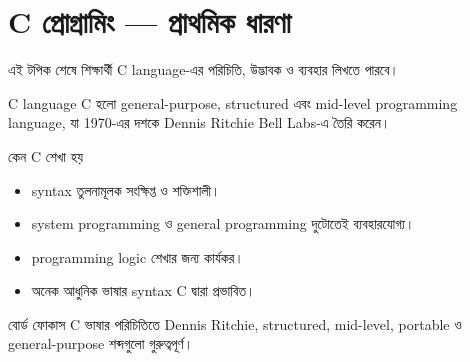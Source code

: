 \section{C প্রোগ্রামিং — প্রাথমিক ধারণা}

\begin{learningbox}
এই টপিক শেষে শিক্ষার্থী C language-এর পরিচিতি, উদ্ভাবক ও ব্যবহার লিখতে পারবে।
\end{learningbox}

\begin{definitionbox}{C language}
C হলো general-purpose, structured এবং mid-level programming language, যা 1970-এর দশকে Dennis Ritchie Bell Labs-এ তৈরি করেন।
\end{definitionbox}

\begin{keypointbox}{কেন C শেখা হয়}
\begin{itemize}
\item syntax তুলনামূলক সংক্ষিপ্ত ও শক্তিশালী।
\item system programming ও general programming দুটোতেই ব্যবহারযোগ্য।
\item programming logic শেখার জন্য কার্যকর।
\item অনেক আধুনিক ভাষার syntax C দ্বারা প্রভাবিত।
\end{itemize}
\end{keypointbox}

\begin{boardbox}{বোর্ড ফোকাস}
C ভাষার পরিচিতিতে Dennis Ritchie, structured, mid-level, portable ও general-purpose শব্দগুলো গুরুত্বপূর্ণ।
\end{boardbox}
